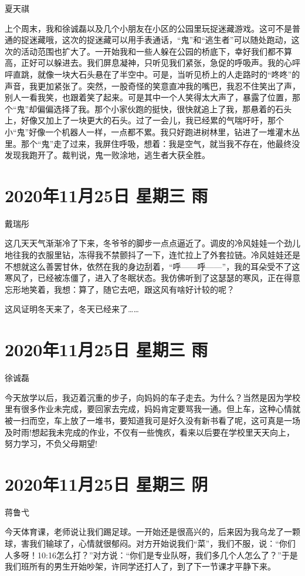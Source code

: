 夏天祺

上个周末，我和徐诚磊以及几个小朋友在小区的公园里玩捉迷藏游戏。这可不是普通的捉迷藏哦，这次的捉迷藏可以用手表通话，“鬼”和“逃生者”可以随处跑动，这次的活动范围也扩大了。一开始我和一些人躲在公园的桥底下，幸好我们都不算高，正好可以躲进去。我们屏息凝神，只听见我们紧张，急促的呼吸声。我的心呯呯直跳，就像一块大石头悬在了半空中。可是，当听见桥上的人走路时的“咚咚”的声音，我更加紧张了。突然，一股奇怪的笑意直冲我的嘴巴，我忍不住笑出了声，别人一看我笑，也跟着笑了起来。可是其中一个人笑得太大声了，暴露了位置，那个“鬼”却偏偏选择了我。那个小家伙跑的挺快，很快就追上了我，那悬着的石头上，好像又加上了一块更大的石头。过了一会儿，我已经累的气喘吁吁，那个小“鬼”好像一个机器人一样，一点都不累。我只好跑进树林里，钻进了一堆灌木丛里。那个“鬼”走了过来，我屏住呼吸，想着：我是空气，就当我不存在，他最终没发现我跑开了。裁判说，鬼一败涂地，逃生者大获全胜。

\section{2020年11月25日 星期三 雨}

戴瑞彤

这几天天气渐渐冷了下来，冬爷爷的脚步一点点逼近了。调皮的冷风娃娃一个劲儿地往我的衣服里钻，冻得我不禁颤抖了一下，连忙拉上了外套拉链。冷风娃娃还是不想就这么善罢甘休，依然在我的身边刮着，“呼——呼——”，我的耳朵受不了这寒风了，已经被冻僵了，进入了冬眠状态。我仿佛听到了这瑟瑟的寒风，正在得意忘形地笑着，我想：算了，随它去吧，跟这风有啥好计较的呢？

这风证明冬天来了，冬天已经来了……

\section{2020年11月25日 星期三 雨}

徐诚磊

今天放学以后，我迈着沉重的步子，向妈妈的车子走去。为什么？当然是因为学校里有很多作业未完成，要回家去完成，妈妈肯定要骂我一通。但上车，这种心情就被一扫而空，车上放了一堆书，要知道我可是好久没有新书看了呢，这可真是一场及时雨!想起我未完成的作业，不仅有一些愧疚，看来以后要在学校里天天向上，努力学习，不负父母期望!

\section{2020年11月25日 星期三 阴}

蒋鲁弋

今天体育课，老师说让我们踢足球。一开始还是很高兴的，后来因为我乌龙了一颗球，害我们输球了，心情就很郁闷。对方开始说我们“菜”，我们不服，说：“你们人多呀！10:16怎么打？”对方说：“你们是专业队呀，我们多几个人怎么了？”于是我们班所有的男生开始吵架，许同学还打人了，到了下一节课才平静下来。


